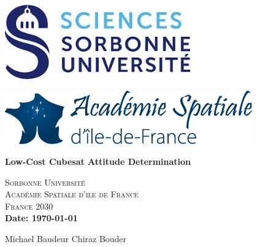 \documentclass[a4paper, 12pt]{article}
\begin{document}
\begin{titlepage}
    \vspace*{\fill}  %
    \centering

    \begin{minipage}{0.45\textwidth}
        \centering
        \includegraphics[width=0.6\textwidth]{fig/SU.jpg}
    \end{minipage}%
    \hfill
    \begin{minipage}{0.45\textwidth}
        \centering
        \includegraphics[width=0.8\textwidth]{fig/Academie_Spatiale.png}
    \end{minipage}

    \vspace{5cm}

    {\bfseries\Huge Low-Cost Cubesat Attitude Determination\par}
        \vspace{3cm}
    \textsc{\LARGE Sorbonne Université}\\[1cm]
    \textsc{\Large Académie Spatiale d'ile de France }\\[1cm]
    \textsc{\Large France 2030 }\\[1cm]
    \vspace{3cm}
    \textbf{Date: \today}
\vspace{2cm}

Michael Baudeur \hfill 
Chiraz Bouder\\


    \vspace*{\fill}  %
\end{titlepage}
 \vspace*{\fill}
\begin{abstract}

This work is part of the Académie Spatiale d’Île-de-France initiative, aiming to introduce students to the challenges of modern aerospace engineering. This project involves the design, implementation, and validation of a low-cost attitude determination system for a CubeSat in low orbit using magnetometer and sun sensor data. The system is implemented on an ESP32 microcontroller, enabling real-time processing. Hardware implementation and testing are fully integrated as part of this work. 

 \vspace*{\fill}
\end{abstract}
\end{document}
